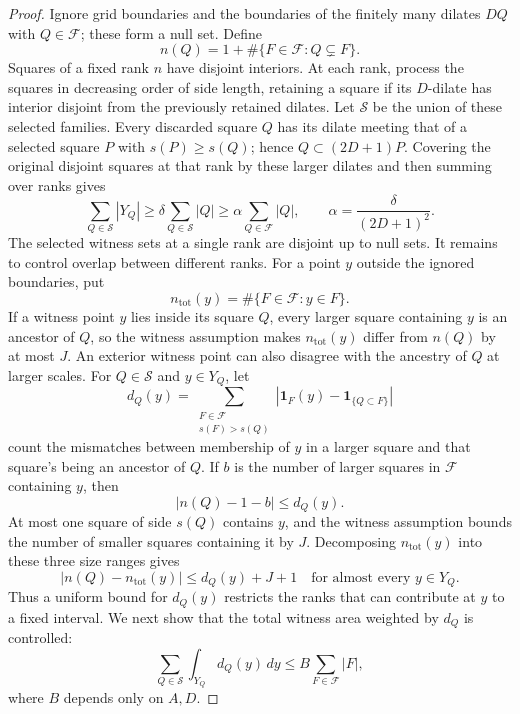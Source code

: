 \begin{proof}
Ignore grid boundaries and the boundaries of the finitely many dilates
$DQ$ with $Q\in\mathcal F$; these form a null set. Define
\[
 n(Q)=1+\#\{F\in\mathcal F:Q\subsetneq F\}.
\]
Squares of a fixed rank $n$ have disjoint interiors. At each rank,
process the squares in decreasing order of side length, retaining a
square if its $D$-dilate has interior disjoint from the previously
retained dilates. Let $\mathcal S$ be the union of these selected
families. Every discarded square $Q$ has its dilate meeting that of a
selected square $P$ with $s(P)\ge s(Q)$; hence
$Q\subset(2D+1)P$. Covering the original disjoint squares at that rank
by these larger dilates and then summing over ranks gives
\[
 \sum_{Q\in\mathcal S}|Y_Q|
 \ge\delta\sum_{Q\in\mathcal S}|Q|
 \ge\alpha\sum_{Q\in\mathcal F}|Q|,
 \qquad \alpha=\frac{\delta}{(2D+1)^2}.
\]
The selected witness sets at a single rank are disjoint up to null
sets. It remains to control overlap between different ranks. For a
point $y$ outside the ignored boundaries, put
\[
 n_{\mathrm{tot}}(y)=\#\{F\in\mathcal F:y\in F\}.
\]
If a witness point $y$ lies inside its square $Q$, every larger square
containing $y$ is an ancestor of $Q$, so the witness assumption makes
$n_{\mathrm{tot}}(y)$ differ from $n(Q)$ by at most $J$. An exterior
witness point can also disagree with the ancestry of $Q$ at larger
scales. For $Q\in\mathcal S$ and $y\in Y_Q$, let
\[
 d_Q(y)=
 \sum_{\substack{F\in\mathcal F\\s(F)>s(Q)}}
 \left|\mathbf 1_F(y)-\mathbf 1_{\{Q\subset F\}}\right|
\]
count the mismatches between membership of $y$ in a larger square and
that square's being an ancestor of $Q$. If $b$ is the number of larger
squares in $\mathcal F$ containing $y$, then
\[
 |n(Q)-1-b|\le d_Q(y).
\]
At most one square of side $s(Q)$ contains $y$, and the witness
assumption bounds the number of smaller squares containing it by $J$.
Decomposing $n_{\mathrm{tot}}(y)$ into these three size ranges gives
\begin{equation}\label{eq:rank-mismatch}
 |n(Q)-n_{\mathrm{tot}}(y)|\le d_Q(y)+J+1
 \quad\text{for almost every }y\in Y_Q.
\end{equation}
Thus a uniform bound for $d_Q(y)$ restricts the ranks that can contribute
at $y$ to a fixed interval. We next show that the total witness area
weighted by $d_Q$ is controlled:
\begin{equation}
\label{eq:mismatch}
 \sum_{Q\in\mathcal S}\int_{Y_Q}d_Q(y)\,dy
 \le B\sum_{F\in\mathcal F}|F|,
\end{equation}
where $B$ depends only on $A,D$.


\end{proof}
